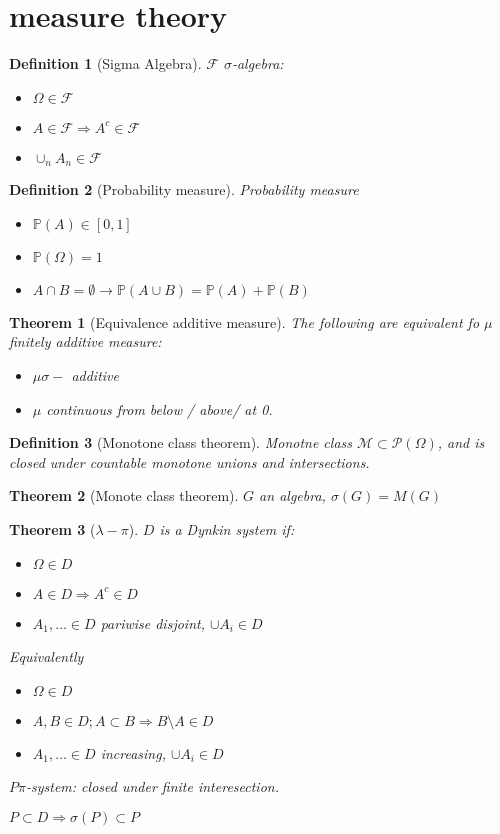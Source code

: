 \documentclass{article}
\newtheorem{theorem}{Theorem}
\newtheorem{definition}{Definition}
\begin{document}
\section{measure theory}
  
\begin{definition}[Sigma Algebra]
  $\mathcal F$ $\sigma$-algebra:
  \begin{itemize}
  \item $\Omega \in \mathcal F$
  \item $A \in \mathcal F \Rightarrow A^c \in \mathcal F$
  \item $\cup_n A_n \in \mathcal F$
  \end{itemize}
\end{definition}
\begin{definition}[Probability measure]
  Probability measure
  \begin{itemize}
  \item $\mathbb P(A) \in [0, 1]$
  \item $\mathbb P(\Omega) = 1$
  \item $A \cap B = \emptyset \rightarrow \mathbb P(A \cup B) = \mathbb P(A) + \mathbb P(B)$
  \end{itemize}
\end{definition}
\begin{theorem}[Equivalence additive measure]
  The following are equivalent fo $\mu$ finitely additive measure:
  \begin{itemize}
  \item $\mu \sigma-$ additive
  \item $\mu$ continuous from below / above/ at 0.
  \end{itemize}
\end{theorem}
\begin{definition}[Monotone class theorem]
  Monotne class $\mathcal M \subset \mathcal P(\Omega)$,  and is closed under countable monotone unions and intersections.
\end{definition}
\begin{theorem}[Monote class theorem]
  $G$ an algebra, $\sigma(G) = M(G)$
\end{theorem}
\begin{theorem}[$\lambda-\pi$]
  $D$ is a Dynkin system if:
  \begin{itemize}
  \item $\Omega \in D$
  \item $A \in D \Rightarrow A^c \in D$ 
  \item $A_1, \ldots \in D$ pariwise disjoint, $\cup A_i \in D$
  \end{itemize}
  Equivalently
  \begin{itemize}
  \item $\Omega \in D$
  \item $A,B \in D ; A \subset B \Rightarrow B \setminus A \in D$ 
  \item $A_1, \ldots \in D$ increasing, $\cup A_i \in D$
  \end{itemize}

  $P \pi$-system: closed under finite interesection.

  $P \subset D \Rightarrow \sigma(P) \subset P$
\end{theorem}
\end{document}
